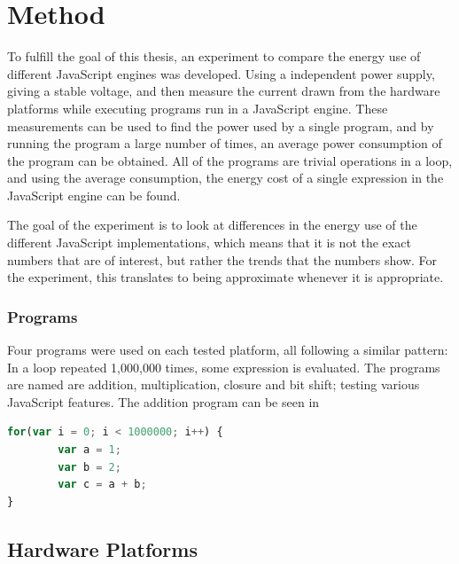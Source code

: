 \chapter{Method}
\label{ch:chapter3}


To fulfill the goal of this thesis, an experiment to compare the energy use of different JavaScript engines was developed.
Using a independent power supply, giving a stable voltage, and then measure the current drawn from the hardware platforms while executing programs run in a JavaScript engine.
These measurements can be used to find the power used by a single program, and by running the program a large number of times, an average power consumption of the program can be obtained.
All of the programs are trivial operations in a loop, and using the average consumption, the energy cost of a single expression in the JavaScript engine can be found.

The goal of the experiment is to look at differences in the energy use of the different JavaScript implementations, which means that it is not the exact numbers that are of interest, but rather the trends that the numbers show.
For the experiment, this translates to being approximate whenever it is appropriate.


\subsection{Programs}
Four programs were used on each tested platform, all following a similar pattern: In a loop repeated 1,000,000 times, some expression is evaluated.
The programs are named  are addition, multiplication, closure and bit shift; testing various JavaScript features.
The addition program can be seen in 


\begin{lstlisting}[language=JavaScript,caption={Addition program}, label={lst:add}]
for(var i = 0; i < 1000000; i++) {
        var a = 1;
        var b = 2;
        var c = a + b;
}
\end{lstlisting}



\section{Hardware Platforms}

